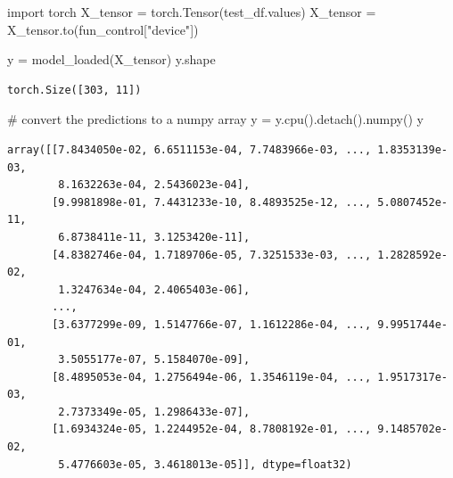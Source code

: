 \documentclass[
  letterpaper,
  DIV=11,
  numbers=noendperiod]{scrreprt}
\newenvironment{Shaded}{\begin{snugshade}}{\end{snugshade}}
\newcommand{\CommentTok}[1]{\textcolor[rgb]{0.37,0.37,0.37}{#1}}
\newcommand{\ImportTok}[1]{\textcolor[rgb]{0.00,0.46,0.62}{#1}}
\newcommand{\NormalTok}[1]{\textcolor[rgb]{0.00,0.23,0.31}{#1}}
\newcommand{\OperatorTok}[1]{\textcolor[rgb]{0.37,0.37,0.37}{#1}}
\newcommand{\StringTok}[1]{\textcolor[rgb]{0.13,0.47,0.30}{#1}}
\begin{document}
\begin{Shaded}
\begin{Highlighting}[]
\ImportTok{import}\NormalTok{ torch}
\NormalTok{X\_tensor }\OperatorTok{=}\NormalTok{ torch.Tensor(test\_df.values)}
\NormalTok{X\_tensor }\OperatorTok{=}\NormalTok{ X\_tensor.to(fun\_control[}\StringTok{"device"}\NormalTok{])}
\end{Highlighting}
\end{Shaded}

\begin{Shaded}
\begin{Highlighting}[]
\NormalTok{y }\OperatorTok{=}\NormalTok{ model\_loaded(X\_tensor)}
\NormalTok{y.shape}
\end{Highlighting}
\end{Shaded}

\begin{verbatim}
torch.Size([303, 11])
\end{verbatim}

\begin{Shaded}
\begin{Highlighting}[]
\CommentTok{\# convert the predictions to a numpy array}
\NormalTok{y }\OperatorTok{=}\NormalTok{ y.cpu().detach().numpy()}
\NormalTok{y}
\end{Highlighting}
\end{Shaded}

\begin{verbatim}
array([[7.8434050e-02, 6.6511153e-04, 7.7483966e-03, ..., 1.8353139e-03,
        8.1632263e-04, 2.5436023e-04],
       [9.9981898e-01, 7.4431233e-10, 8.4893525e-12, ..., 5.0807452e-11,
        6.8738411e-11, 3.1253420e-11],
       [4.8382746e-04, 1.7189706e-05, 7.3251533e-03, ..., 1.2828592e-02,
        1.3247634e-04, 2.4065403e-06],
       ...,
       [3.6377299e-09, 1.5147766e-07, 1.1612286e-04, ..., 9.9951744e-01,
        3.5055177e-07, 5.1584070e-09],
       [8.4895053e-04, 1.2756494e-06, 1.3546119e-04, ..., 1.9517317e-03,
        2.7373349e-05, 1.2986433e-07],
       [1.6934324e-05, 1.2244952e-04, 8.7808192e-01, ..., 9.1485702e-02,
        5.4776603e-05, 3.4618013e-05]], dtype=float32)
\end{verbatim}
\end{document}
